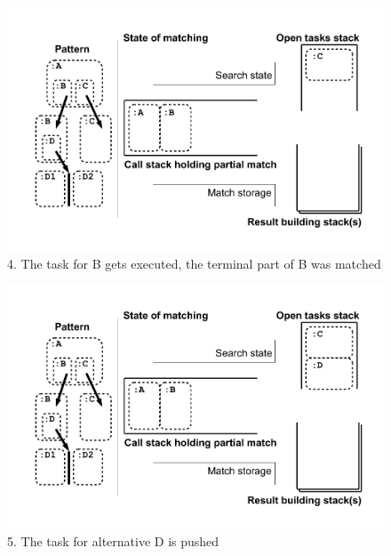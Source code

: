 \begin{figure}[htbp]
  \centering
  \includegraphics[width=\textwidth]{fig/Passungszustand4}
  \caption{4. The task for B gets executed, the terminal part of B was matched}
  \label{figmatchingstate4}
\end{figure}

\begin{figure}[htbp]
  \centering
  \includegraphics[width=\textwidth]{fig/Passungszustand5}
  \caption{5. The task for alternative D is pushed}
  \label{figmatchingstate5}
\end{figure}

